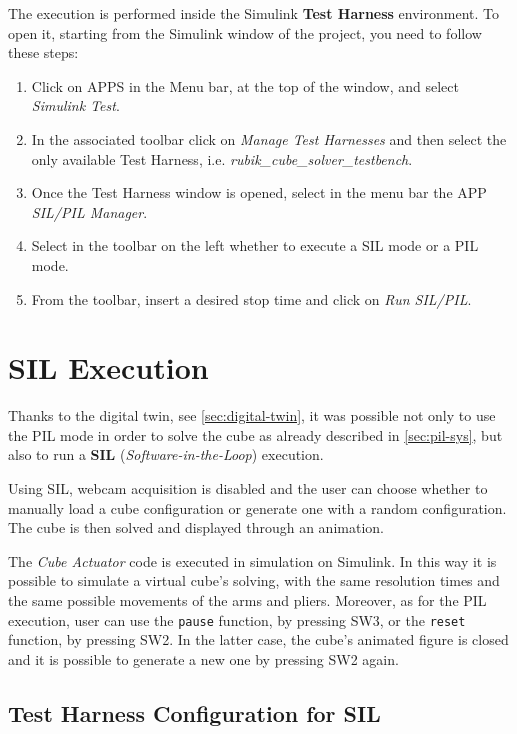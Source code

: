 \documentclass{report}
\begin{document}
The execution is performed inside the Simulink \textbf{Test Harness} environment.
To open it, starting from the Simulink window of the project, you need to follow these steps:
\begin{enumerate}
    \item Click on APPS in the Menu bar, at the top of the window, and select \textit{Simulink Test}.
    \item In the associated toolbar click on \textit{Manage Test Harnesses} and then select the only available Test Harness, i.e. \textit{rubik\_cube\_solver\_testbench}.
    \item Once the Test Harness window is opened, select in the menu bar the APP \textit{SIL/PIL Manager}.
    \item Select in the toolbar on the left whether to execute a SIL mode or a PIL mode.
    \item From the toolbar, insert a desired stop time and click on \textit{Run SIL/PIL}.  
\end{enumerate}

\section{SIL Execution}\label{sec:sil}
Thanks to the digital twin, see \ref{sec:digital-twin}, it was possible not only to use the PIL mode in order to solve the cube as already described in \ref{sec:pil-sys}, but also to run a \textbf{SIL} (\textit{Software-in-the-Loop}) execution.

Using SIL, webcam acquisition is disabled and the user can choose whether to manually load a cube configuration or generate one with a random configuration. The cube is then solved and displayed through an animation.

The \textit{Cube Actuator} code is executed in simulation on Simulink. In this way it is possible to simulate a virtual cube's solving, with the same resolution times and the same possible movements of the arms and pliers. Moreover, as for the PIL execution, user can use the \texttt{pause} function, by pressing SW3, or the \texttt{reset} function, by pressing SW2. In the latter case, the cube's animated figure is closed and it is possible to generate a new one by pressing SW2 again.

\subsection{Test Harness Configuration for SIL}
\end{document}
